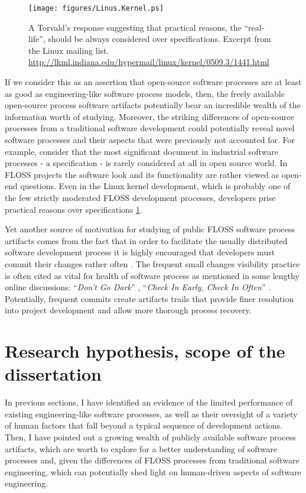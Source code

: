 \begin{figure}[ht!]
   \centering
   \texttt{[image: figures/Linus.Kernel.ps]}
   \caption{A Torvald's response suggesting that practical reasons, the ``real-life'', should be always considered 
   over specifications.
   Excerpt from the Linux mailing list. \url{http://lkml.indiana.edu/hypermail/linux/kernel/0509.3/1441.html}}
   \label{fig:kernel}
\end{figure}

If we consider this as an assertion that open-source software processes are at least as good as engineering-like 
software process models, then, the freely available open-source process software artifacts potentially bear an 
incredible wealth of the information worth of studying. Moreover, the striking differences of open-source processes 
from a traditional software development could potentially reveal novel software processes and their aspects that 
were previously not accounted for. 
For example, consider that the most significant document in industrial software processes - a specification - 
is rarely considered at all in open source world. In FLOSS projects the software look and its functionality are 
rather viewed as open-end questions. Even in the Linux kernel development, which is probably one of the few strictly 
moderated FLOSS development processes, developers prise practical reasons over specifications 
\ref{fig:kernel}.

Yet another source of motivation for studying of public FLOSS software process artifacts comes from the fact that 
in order to facilitate the usually distributed software development process it is highly encouraged that developers
must commit their changes rather often \cite{so-checkin} \cite{git-best-practices1}.
The frequent small changes visibility practice is often cited as vital for health of software process as mentioned 
in some lengthy online discussions: ``\textit{Don't Go Dark}'' \cite{checkin-dgd-2008}, 
``\textit{Check In Early, Check In Often}'' \cite{checkin-ch-2012}. Potentially, frequent commits create artifacts 
trails that provide finer resolution into project development and allow more thorough process recovery.

%
%
\section{Research hypothesis, scope of the dissertation}\label{section_research_hypothesis}
In previous sections, I have identified an evidence of the limited performance of existing engineering-like 
software processes, as well as their oversight of a variety of human factors that fall beyond a typical 
sequence of development actions.
Then, I have pointed out a growing wealth of publicly available software process artifacts, which 
are worth to explore for a better understanding of software processes and, 
given the differences of FLOSS processes from traditional software engineering, which can potentially 
shed light on human-driven aspects of software engineering.

